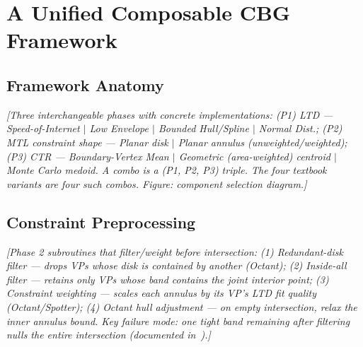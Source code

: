 \section{A Unified Composable CBG Framework}
\label{sec:framework}

%
%
%
%

\subsection{Framework Anatomy}
\label{sec:framework-anatomy}
\textit{[Three interchangeable phases with concrete implementations:
(P1) LTD — Speed-of-Internet $\mid$ Low Envelope $\mid$ Bounded Hull/Spline $\mid$ Normal Dist.;
(P2) MTL constraint shape — Planar disk $\mid$ Planar annulus (unweighted/weighted);
(P3) CTR — Boundary-Vertex Mean $\mid$ Geometric (area-weighted) centroid $\mid$ Monte Carlo medoid.
A combo is a (P1, P2, P3) triple. The four textbook variants are four such combos.
Figure: component selection diagram.]}

\subsection{Constraint Preprocessing}
\label{sec:framework-preprocessing}
\textit{[Phase 2 subroutines that filter/weight before intersection:
(1) Redundant-disk filter — drops VPs whose disk is contained by another (Octant);
(2) Inside-all filter — retains only VPs whose band contains the joint interior point;
(3) Constraint weighting — scales each annulus by its VP's LTD fit quality (Octant/Spotter);
(4) Octant hull adjustment — on empty intersection, relax the inner annulus bound.
Key failure mode: one tight band remaining after filtering nulls the entire intersection
(documented in~\cite{finding_spherical_circle_brittle}).]}

